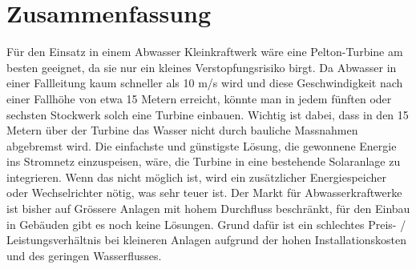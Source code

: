 \section{Zusammenfassung}

Für den Einsatz in einem Abwasser Kleinkraftwerk wäre eine Pelton-Turbine am besten geeignet, da sie nur ein kleines Verstopfungsrisiko birgt. Da Abwasser in einer Fallleitung kaum schneller als 10 m/s wird und diese Geschwindigkeit nach einer Fallhöhe von etwa 15 Metern erreicht, könnte man in jedem fünften oder sechsten Stockwerk solch eine Turbine einbauen. Wichtig ist dabei, dass in den 15 Metern über der Turbine das Wasser nicht durch bauliche Massnahmen abgebremst wird. Die einfachste und günstigste Lösung, die gewonnene Energie ins Stromnetz einzuspeisen, wäre, die Turbine in eine bestehende Solaranlage zu integrieren. Wenn das nicht möglich ist, wird ein zusätzlicher Energiespeicher oder Wechselrichter nötig, was sehr teuer ist. Der Markt für Abwasserkraftwerke ist bisher auf Grössere Anlagen mit hohem Durchfluss beschränkt, für den Einbau in Gebäuden gibt es noch keine Lösungen. Grund dafür ist ein schlechtes Preis- / Leistungsverhältnis bei kleineren Anlagen aufgrund der hohen Installationskosten und des geringen Wasserflusses.